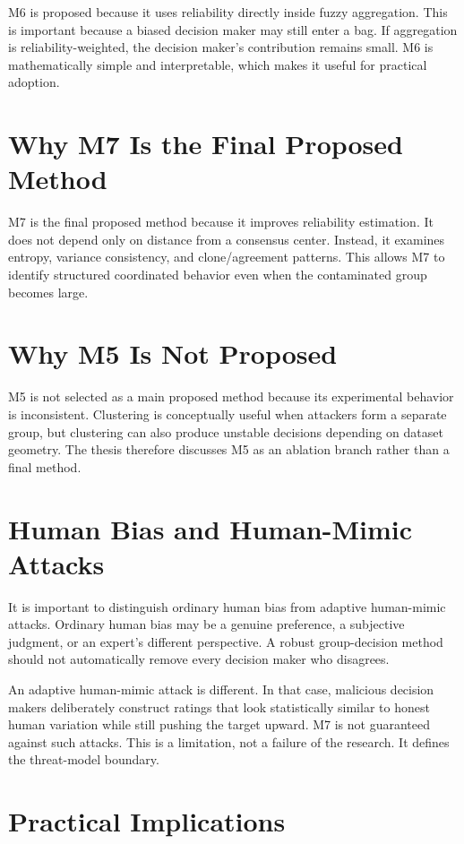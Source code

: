 M6 is proposed because it uses reliability directly inside fuzzy aggregation. This is important because a biased decision maker may still enter a bag. If aggregation is reliability-weighted, the decision maker's contribution remains small. M6 is mathematically simple and interpretable, which makes it useful for practical adoption.

\section{Why M7 Is the Final Proposed Method}

M7 is the final proposed method because it improves reliability estimation. It does not depend only on distance from a consensus center. Instead, it examines entropy, variance consistency, and clone/agreement patterns. This allows M7 to identify structured coordinated behavior even when the contaminated group becomes large.

\section{Why M5 Is Not Proposed}

M5 is not selected as a main proposed method because its experimental behavior is inconsistent. Clustering is conceptually useful when attackers form a separate group, but clustering can also produce unstable decisions depending on dataset geometry. The thesis therefore discusses M5 as an ablation branch rather than a final method.

\section{Human Bias and Human-Mimic Attacks}

It is important to distinguish ordinary human bias from adaptive human-mimic attacks. Ordinary human bias may be a genuine preference, a subjective judgment, or an expert's different perspective. A robust group-decision method should not automatically remove every decision maker who disagrees.

An adaptive human-mimic attack is different. In that case, malicious decision makers deliberately construct ratings that look statistically similar to honest human variation while still pushing the target upward. M7 is not guaranteed against such attacks. This is a limitation, not a failure of the research. It defines the threat-model boundary.

\section{Practical Implications}

